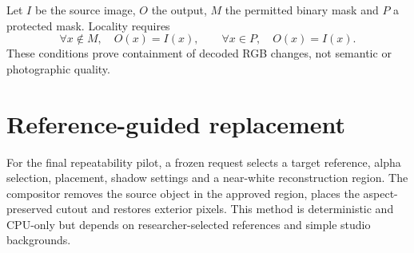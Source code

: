 Let $I$ be the source image, $O$ the output, $M$ the permitted binary mask and $P$ a protected mask. Locality requires
\[
\forall x\notin M,\quad O(x)=I(x), \qquad \forall x\in P,\quad O(x)=I(x).
\]
These conditions prove containment of decoded RGB changes, not semantic or photographic quality.

\section{Reference-guided replacement}
For the final repeatability pilot, a frozen request selects a target reference, alpha selection, placement, shadow settings and a near-white reconstruction region. The compositor removes the source object in the approved region, places the aspect-preserved cutout and restores exterior pixels. This method is deterministic and CPU-only but depends on researcher-selected references and simple studio backgrounds.
